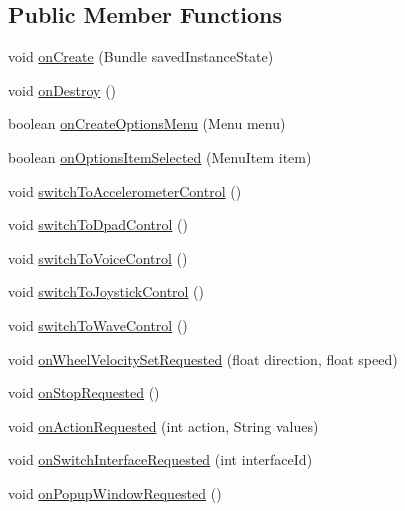 \subsection*{Public Member Functions}
\begin{DoxyCompactItemize}
\item 
void \hyperlink{classcom_1_1cellbots_1_1remote_1_1_cellbot_r_c_activity_a5a9a282b946f9d4444aee45a475ea4f6}{on\-Create} (Bundle saved\-Instance\-State)
\item 
void \hyperlink{classcom_1_1cellbots_1_1remote_1_1_cellbot_r_c_activity_ab1df8db7d9cf46c4429c6894de95b744}{on\-Destroy} ()
\item 
boolean \hyperlink{classcom_1_1cellbots_1_1remote_1_1_cellbot_r_c_activity_ab7f67cfd2cbe168b6d697e141b1f2344}{on\-Create\-Options\-Menu} (Menu menu)
\item 
boolean \hyperlink{classcom_1_1cellbots_1_1remote_1_1_cellbot_r_c_activity_a47c735fb6e31001123f446b4ba413a72}{on\-Options\-Item\-Selected} (Menu\-Item item)
\item 
void \hyperlink{classcom_1_1cellbots_1_1remote_1_1_cellbot_r_c_activity_a1717a7d5b7f431f75bce424eefdc9a7f}{switch\-To\-Accelerometer\-Control} ()
\item 
void \hyperlink{classcom_1_1cellbots_1_1remote_1_1_cellbot_r_c_activity_a1c453007e262cee9de60f509cf97276a}{switch\-To\-Dpad\-Control} ()
\item 
void \hyperlink{classcom_1_1cellbots_1_1remote_1_1_cellbot_r_c_activity_af02ee12e63e6f4e6470d1cb1098a2e13}{switch\-To\-Voice\-Control} ()
\item 
void \hyperlink{classcom_1_1cellbots_1_1remote_1_1_cellbot_r_c_activity_a938babf1d3267369a06ea3c2f1d09c27}{switch\-To\-Joystick\-Control} ()
\item 
void \hyperlink{classcom_1_1cellbots_1_1remote_1_1_cellbot_r_c_activity_aee80f644f44df7124d4d08cf8a18a4c5}{switch\-To\-Wave\-Control} ()
\item 
void \hyperlink{classcom_1_1cellbots_1_1remote_1_1_cellbot_r_c_activity_a29126d7feff45de148ec68acfbc8367b}{on\-Wheel\-Velocity\-Set\-Requested} (float direction, float speed)
\item 
void \hyperlink{classcom_1_1cellbots_1_1remote_1_1_cellbot_r_c_activity_a68edabcee448f7ffc6c8456ad7b9ee6e}{on\-Stop\-Requested} ()
\item 
void \hyperlink{classcom_1_1cellbots_1_1remote_1_1_cellbot_r_c_activity_a03122cf1acabbbfa1450deafc4fb409f}{on\-Action\-Requested} (int action, String values)
\item 
void \hyperlink{classcom_1_1cellbots_1_1remote_1_1_cellbot_r_c_activity_a43e68442620e59e6827a966ae244abdb}{on\-Switch\-Interface\-Requested} (int interface\-Id)
\item 
void \hyperlink{classcom_1_1cellbots_1_1remote_1_1_cellbot_r_c_activity_a0e1358225117cf7f22d0e503842de0ec}{on\-Popup\-Window\-Requested} ()
\end{DoxyCompactItemize}
